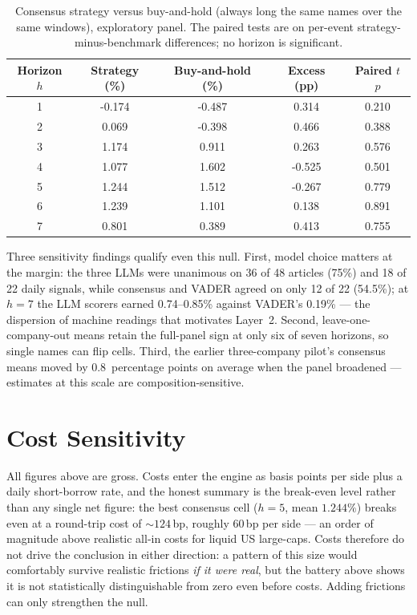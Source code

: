 \begin{table}[htbp]
  \centering
  \caption{Consensus strategy versus buy-and-hold (always long the
  same names over the same windows), exploratory panel. The paired
  tests are on per-event strategy-minus-benchmark differences; no
  horizon is significant.}
  \label{tab:l1-benchmark}
  \begin{tabular}{@{}S[table-format=1.0] S[table-format=-1.3] S[table-format=-1.3] S[table-format=-1.3] S[table-format=1.3]@{}}
    \toprule
    {Horizon $h$} & {Strategy (\%)} & {Buy-and-hold (\%)} & {Excess (pp)} & {Paired $t$ $p$} \\
     & -0.174 & -0.487 &  0.314 & 0.210 \\
    2 &  0.069 & -0.398 &  0.466 & 0.388 \\
    3 &  1.174 &  0.911 &  0.263 & 0.576 \\
    4 &  1.077 &  1.602 & -0.525 & 0.501 \\
    5 &  1.244 &  1.512 & -0.267 & 0.779 \\
    6 &  1.239 &  1.101 &  0.138 & 0.891 \\
    7 &  0.801 &  0.389 &  0.413 & 0.755 \\
    \bottomrule
  \end{tabular}
\end{table}

Three sensitivity findings qualify even this null. First, model choice
matters at the margin: the three LLMs were unanimous on 36 of 48
articles (75\%) and 18 of 22 daily signals, while consensus and VADER
agreed on only 12 of 22 (54.5\%); at $h=7$ the LLM scorers earned
0.74--0.85\% against VADER's 0.19\% --- the dispersion of machine
readings that motivates Layer~2. Second, leave-one-company-out means
retain the full-panel sign at only six of seven horizons, so single
names can flip cells. Third, the earlier three-company pilot's
consensus means moved by 0.8~percentage points on average when the
panel broadened --- estimates at this scale are composition-sensitive.

\section{Cost Sensitivity}
\label{sec:l1-costs}

All figures above are gross. Costs enter the engine as basis points
per side plus a daily short-borrow rate, and the honest summary is the
break-even level rather than any single net figure: the best consensus
cell ($h=5$, mean $1.244\%$) breaks even at a round-trip cost of
${\sim}124$\,bp, roughly $60$\,bp per side --- an order of magnitude
above realistic all-in costs for liquid US large-caps. Costs therefore
do not drive the conclusion in either direction: a pattern of this
size would comfortably survive realistic frictions \emph{if it were
real}, but the battery above shows it is not statistically
distinguishable from zero even before costs. Adding frictions can only
strengthen the null.

